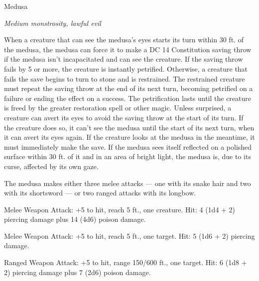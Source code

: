 \begin{monsterbox}{Medusa}
\begin{hangingpar}
\textit{Medium monstrosity, lawful evil}
\end{hangingpar}
\dndline%
\basics[%
armorclass = 15,
hitpoints = 17d8 + 51,
speed = {30 ft.}
]
\dndline%
\stats[%
STR = \stat{10},
DEX = \stat{15},
CON = \stat{16},
INT = \stat{12},
WIS = \stat{13},
CHA = \stat{15}
]
\dndline%
\details[%
skills={Stealth +5, Insight +4, Perception +4, Deception +5, },
damageimmunities={},
savingthrows={},
conditionimmunities={},
damageresistances={},
damagevulnerabilities={},
senses={darkvision 60 ft., passive Perception 14},
languages={Common},
challenge=6
]
\dndline%
\begin{monsteraction}
When a creature that can see the medusa's eyes starts its turn within 30 ft. of the medusa, the medusa can force it to make a DC 14 Constitution saving throw if the medusa isn't incapacitated and can see the creature. If the saving throw fails by 5 or more, the creature is instantly petrified. Otherwise, a creature that fails the save begins to turn to stone and is restrained. The restrained creature must repeat the saving throw at the end of its next turn, becoming petrified on a failure or ending the effect on a success. The petrification lasts until the creature is freed by the greater restoration spell or other magic.
Unless surprised, a creature can avert its eyes to avoid the saving throw at the start of its turn. If the creature does so, it can't see the medusa until the start of its next turn, when it can avert its eyes again. If the creature looks at the medusa in the meantime, it must immediately make the save.
If the medusa sees itself reflected on a polished surface within 30 ft. of it and in an area of bright light, the medusa is, due to its curse, affected by its own gaze.
\end{monsteraction}
\begin{monsteraction}[Multiattack]
The medusa makes either three melee attacks —  one with its snake hair and two with its shortsword — or two ranged attacks with its longbow.
\end{monsteraction}
\begin{monsteraction}
Melee Weapon Attack: +5 to hit, reach 5 ft., one creature. Hit: 4 (1d4 + 2) piercing damage plus 14 (4d6) poison damage.
\end{monsteraction}
\begin{monsteraction}[Shortsword]
Melee Weapon Attack: +5 to hit, reach 5 ft., one target. Hit: 5 (1d6 + 2) piercing damage.
\end{monsteraction}
\begin{monsteraction}[Longbow]
Ranged Weapon Attack: +5 to hit, range 150/600 ft., one target. Hit: 6 (1d8 + 2) piercing damage plus 7 (2d6) poison damage.
\end{monsteraction}
\end{monsterbox}
